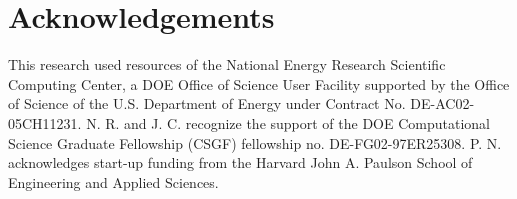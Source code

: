 \documentclass[aps,prb,twocolumn,
	groupedaddress,superscriptaddress,
	amsfonts,amssymb,amsmath,floatfix,
	citeautoscript]{revtex4-1}
\begin{document}
\section{Acknowledgements}
This research used resources of the National Energy Research Scientific Computing Center, a DOE Office of Science User Facility supported by the Office of Science of the U.S. Department of Energy under Contract No. DE-AC02-05CH11231. N. R. and J. C. recognize the support of the DOE Computational Science Graduate Fellowship (CSGF) fellowship no.  DE-FG02-97ER25308. P. N. acknowledges start-up funding from the Harvard John A. Paulson School of Engineering and Applied Sciences. %



\end{document}
